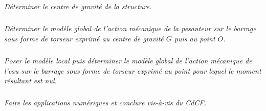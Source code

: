 \documentclass[10pt]{article}
\begin{document}
\subparagraph{}
\textit{Déterminer le centre de gravité de la structure.}

\subparagraph{}
\textit{Déterminer le modèle global de l'action mécanique de la pesanteur sur le barrage sous forme de torseur exprimé au centre de gravité $G$ puis au point $O$.}

\subparagraph{}
\textit{Poser le modèle local puis déterminer le modèle global de l'action mécanique de l'eau sur le barrage sous forme de torseur exprimé au point pour lequel le moment résultant est nul.}
\subparagraph{}
\textit{Faire les applications numériques et conclure vis-à-vis du CdCF.}
\end{document}
